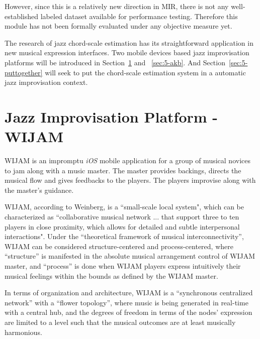 However, since this is a relatively new direction in MIR, there is not any well-established labeled dataset available for performance testing. Therefore this module has not been formally evaluated under any objective measure yet.

The research of jazz chord-scale estimation has its straightforward application in new musical expression interfaces. Two mobile devices based jazz improvisation platforms will be introduced in Section~\ref{sec:5-wijam} and ~\ref{sec:5-akb}. And Section~\ref{sec:5-puttogether} will seek to put the chord-scale estimation system in a automatic jazz improvisation context.

\section{Jazz Improvisation Platform - WIJAM} \label{sec:5-wijam}
WIJAM is an impromptu \textit{iOS} mobile application for a group of musical novices to jam along with a music master. The master provides backings, directs the musical flow and gives feedbacks to the players. The players improvise along with the master's guidance.

WIJAM, according to Weinberg\cite{weinberg2005interconnected}, is a ``small-scale local system", which can be characterized as ``collaborative musical network ... that support three to ten players in close proximity, which allows for detailed and subtle interpersonal interactions". Under the ``theoretical framework of musical interconnectivity''\cite{weinberg2005interconnected}, WIJAM can be considered structure-centered and process-centered, where ``structure'' is manifested in the absolute musical arrangement control of WIJAM master, and ``process'' is done when WIJAM players express intuitively their musical feelings within the bounds as defined by the WIJAM master.

In terms of organization and architecture, WIJAM is a ``synchronous centralized network'' with a ``flower topology'', where music is being generated in real-time with a central hub, and the degrees of freedom in terms of the nodes' expression are limited to a level such that the musical outcomes are at least musically harmonious.

